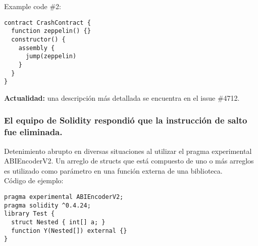 Example code \#2:
\begin{lstlisting}[language=Solidity]
contract CrashContract {                                                                                                                                   
  function zeppelin() {}                                                                                                                                                                                                                                                                   
  constructor() {                                                                                                                         
    assembly {                                                                                                                          
      jump(zeppelin)                                                                                                                         
    }                                                                                                                                   
  }                                                                                                                                       
}
\end{lstlisting}

\textbf{Actualidad:} una descripción más detallada se encuentra en el issue \#4712.

\subsubsection{El equipo de Solidity respondió que la instrucción de salto fue eliminada.}

Detenimiento abrupto en diversas situaciones al utilizar el pragma experimental ABIEncoderV2.
Un arreglo de structs que está compuesto de uno o más arreglos es utilizado como parámetro en una función externa de una biblioteca.\\

Código de ejemplo:
\begin{lstlisting}[language=Solidity]
pragma experimental ABIEncoderV2;                                                                                                              
pragma solidity ^0.4.24;                                                                                                                              
library Test {                                                                                                                                 
  struct Nested { int[] a; }                                                                                                                 
  function Y(Nested[]) external {}                                                                                                           
}
\end{lstlisting}

